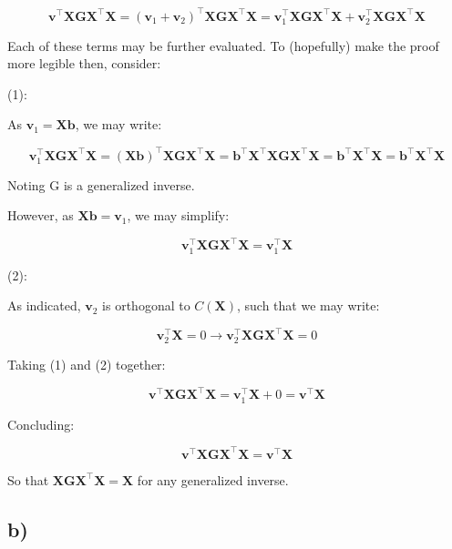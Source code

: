 \documentclass[
]{article}
\begin{document}
\[
\boldsymbol{v}^{\top} \boldsymbol{X} \boldsymbol{G} \boldsymbol{X}^{\top} \boldsymbol{X} 
= (\boldsymbol{v}_1 + \boldsymbol{v}_2)^{\top} \boldsymbol{X} \boldsymbol{G} \boldsymbol{X}^{\top} \boldsymbol{X} = \boldsymbol{v}_1^{\top} \boldsymbol{X} \boldsymbol{G} \boldsymbol{X}^{\top} \boldsymbol{X} 
+ \boldsymbol{v}_2^{\top} \boldsymbol{X} \boldsymbol{G} \boldsymbol{X}^{\top} \boldsymbol{X}
\]

Each of these terms may be further evaluated. To (hopefully) make the
proof more legible then, consider:

(1):

As \(\boldsymbol{v}_1 = \boldsymbol{X} \boldsymbol{b}\), we may write:

\[
\boldsymbol{v}_1^{\top} \boldsymbol{X} \boldsymbol{G} \boldsymbol{X}^{\top} \boldsymbol{X} 
= (\boldsymbol{X} \boldsymbol{b})^{\top} \boldsymbol{X} \boldsymbol{G} \boldsymbol{X}^{\top} \boldsymbol{X}
= \boldsymbol{b}^{\top} \boldsymbol{X}^{\top} \boldsymbol{X} \boldsymbol{G} \boldsymbol{X}^{\top} \boldsymbol{X}
= \boldsymbol{b}^{\top} \boldsymbol{X}^{\top} \boldsymbol{X} = \boldsymbol{b}^{\top} \boldsymbol{X}^{\top} \boldsymbol{X}
\]

Noting G is a generalized inverse.

However, as \(\boldsymbol{X} \boldsymbol{b} = \boldsymbol{v}_1\), we may
simplify:

\[
\boldsymbol{v}_1^{\top} \boldsymbol{X} \boldsymbol{G} \boldsymbol{X}^{\top} \boldsymbol{X} 
 = \boldsymbol{v}_1^{\top} \boldsymbol{X}
\]

(2):

As indicated, \(\boldsymbol{v}_2\) is orthogonal to
\(C(\boldsymbol{X})\), such that we may write:

\[
\boldsymbol{v}_2^{\top} \boldsymbol{X} = 0 \rightarrow \boldsymbol{v}_2^{\top} \boldsymbol{X} \boldsymbol{G} \boldsymbol{X}^{\top} \boldsymbol{X} = 0
\]

Taking (1) and (2) together:

\[
\boldsymbol{v}^{\top} \boldsymbol{X} \boldsymbol{G} \boldsymbol{X}^{\top} \boldsymbol{X} 
= \boldsymbol{v}_1^{\top} \boldsymbol{X} + 0 = \boldsymbol{v}^{\top} \boldsymbol{X}
\]

Concluding:

\[
\boldsymbol{v^\top X G X^\top X = v^\top X}
\]

So that \(\boldsymbol{X G X^\top X = X}\) for any generalized inverse.

\newpage

\subsection{b)}\label{b-2}
\end{document}
